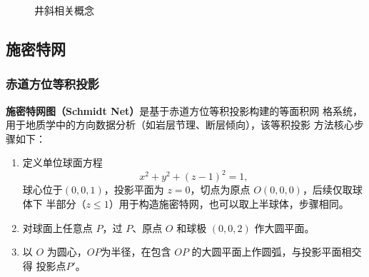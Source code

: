 \documentclass[a4paper,twoside]{ctexart}
\begin{document}
\begin{itemize}
  \begin{figure}[htbp]
  \centering
  \hspace{1cm}
  
  \caption{井斜相关概念}
  \label{fig:井斜相关概念}
\end{figure}
\end{itemize}

\subsection{施密特网}
\label{sec:施密特网}

\subsubsection{赤道方位等积投影}

\textbf{施密特网图（Schmidt Net）}是基于赤道方位等积投影构建的等面积网
格系统，用于地质学中的方向数据分析（如岩层节理、断层倾向），该等积投影
方法核心步骤如下：
\begin{enumerate}[步骤1：]
\item  定义单位球面方程
  \begin{displaymath}
    x^2+y^2+(z-1)^2=1,
  \end{displaymath}
球心位于$(0,0,1)$，投影平面为 $z=0$，切点为原点 $O(0,0,0)$，后续仅取球体下
半部分（$z\leq 1$）用于构造施密特网，也可以取上半球体，步骤相同。 
\item 对球面上任意点 $P$，过 $P$、原点 $O$ 和球极 $(0,0,2)$ 作大圆平面。
\item 以 $O$ 为圆心，$OP$为半径，在包含 $OP$ 的大圆平面上作圆弧，与投影平面相交得
  投影点$P'$。
\end{enumerate}
\end{document}
